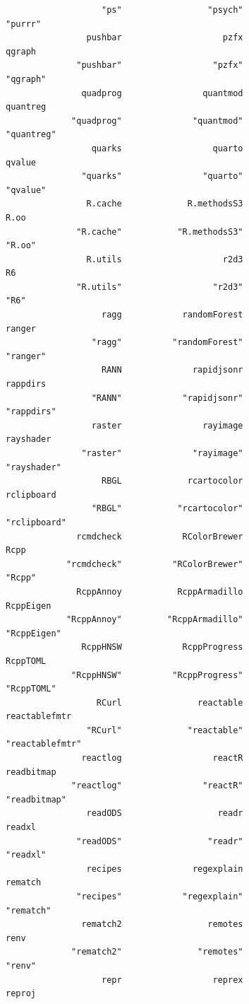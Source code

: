 \documentclass[
  letterpaper,
  DIV=11,
  numbers=noendperiod]{scrreprt}
\begin{document}
\begin{verbatim}
                   "ps"                 "psych"                 "purrr" 
                pushbar                    pzfx                  qgraph 
              "pushbar"                  "pzfx"                "qgraph" 
               quadprog                quantmod                quantreg 
             "quadprog"              "quantmod"              "quantreg" 
                 quarks                  quarto                  qvalue 
               "quarks"                "quarto"                "qvalue" 
                R.cache             R.methodsS3                    R.oo 
              "R.cache"           "R.methodsS3"                  "R.oo" 
                R.utils                    r2d3                      R6 
              "R.utils"                  "r2d3"                    "R6" 
                   ragg            randomForest                  ranger 
                 "ragg"          "randomForest"                "ranger" 
                   RANN              rapidjsonr                rappdirs 
                 "RANN"            "rapidjsonr"              "rappdirs" 
                 raster                rayimage               rayshader 
               "raster"              "rayimage"             "rayshader" 
                   RBGL             rcartocolor              rclipboard 
                 "RBGL"           "rcartocolor"            "rclipboard" 
              rcmdcheck            RColorBrewer                    Rcpp 
            "rcmdcheck"          "RColorBrewer"                  "Rcpp" 
              RcppAnnoy           RcppArmadillo               RcppEigen 
            "RcppAnnoy"         "RcppArmadillo"             "RcppEigen" 
               RcppHNSW            RcppProgress                RcppTOML 
             "RcppHNSW"          "RcppProgress"              "RcppTOML" 
                  RCurl               reactable           reactablefmtr 
                "RCurl"             "reactable"         "reactablefmtr" 
               reactlog                  reactR              readbitmap 
             "reactlog"                "reactR"            "readbitmap" 
                readODS                   readr                  readxl 
              "readODS"                 "readr"                "readxl" 
                recipes              regexplain                 rematch 
              "recipes"            "regexplain"               "rematch" 
               rematch2                 remotes                    renv 
             "rematch2"               "remotes"                  "renv" 
                   repr                  reprex                  reproj 

\end{verbatim}
\end{document}
